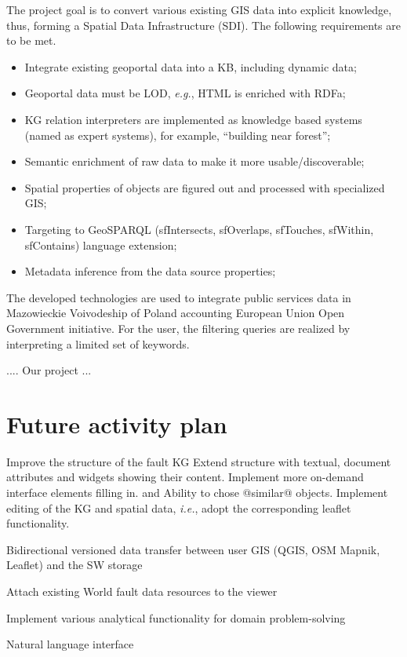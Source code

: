 \documentclass[
]{ceurart}
\begin{document}
   The project \cite{iwaniak17} goal is to convert various existing GIS data into explicit knowledge, thus, forming a Spatial Data Infrastructure (SDI). The following requirements are to be met.
  \begin{itemize}
  \item Integrate existing geoportal data into a KB, including dynamic data;
  \item Geoportal data must be LOD, \emph{e.g.}, HTML is enriched with RDFa;
  \item KG relation interpreters are implemented as knowledge based systems (named as expert systems), for example, ``building near forest'';
  \item Semantic enrichment of raw data to make it more usable/discoverable;
  \item Spatial properties of objects are figured out and processed with specialized GIS;
  \item Targeting to GeoSPARQL (sfIntersects, sfOverlaps, sfTouches, sfWithin, sfContains) language extension;
  \item Metadata inference from the data source properties;
  \end{itemize}
  The developed technologies are used to integrate public services data in Mazowieckie Voivodeship of Poland accounting European Union Open Government initiative.  For the user, the filtering queries are realized by interpreting a limited set of keywords.

  .... Our project ...

\section{Future activity plan}

Improve the structure of the fault KG
Extend structure with textual, document attributes and widgets showing their content.
Implement more on-demand interface elements filling in. and Ability to chose @similar@ objects.
Implement editing of the KG and spatial data, \emph{i.e.}, adopt the corresponding leaflet functionality.

 Bidirectional versioned data transfer between user GIS (QGIS, OSM Mapnik, Leaflet) and the SW storage

Attach existing World fault data resources to the viewer

   Implement various analytical functionality for domain problem-solving

   Natural language interface
\end{document}
